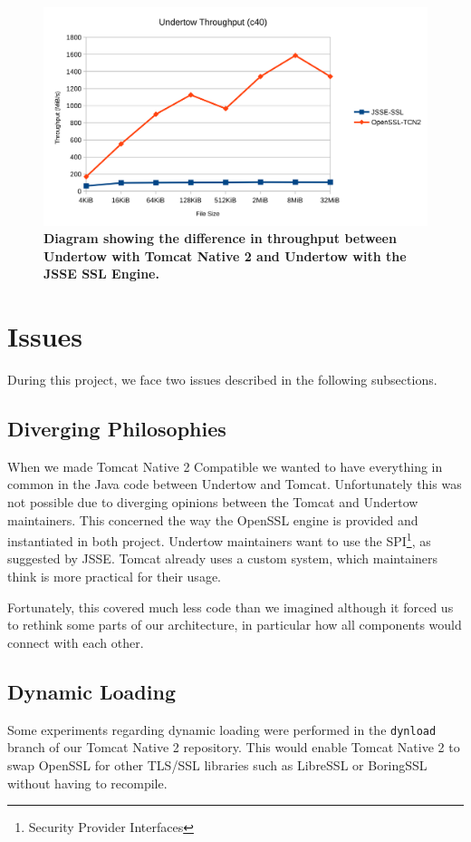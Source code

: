 \documentclass[11pt,a4paper,bibliography=totocnumbered]{scrartcl}
\def\mytitle{Tomcat Native 2}
\begin{document}
\begin{figure}[!h]
	\begin{center}
		\includegraphics[scale=0.23]{undertow-throughput.pdf}
	\end{center}
	\caption{\textbf{Diagram showing the difference in throughput between Undertow with \mytitle{} and Undertow with the JSSE SSL Engine.}}
	\label{fig:undertow-throughput}
\end{figure}

\FloatBarrier
\section{Issues}
\label{sec:issues}
During this project, we face two issues described in the following subsections.
\subsection{Diverging Philosophies}
When we made \mytitle{} Compatible we wanted to have everything in common in the Java code between Undertow and Tomcat. Unfortunately this was not possible due to diverging opinions between the Tomcat and Undertow maintainers. This concerned the way the OpenSSL engine is provided and instantiated in both project. Undertow maintainers want to use the SPI\footnote{Security Provider Interfaces}, as suggested by JSSE. Tomcat already uses a custom system, which maintainers think is more practical for their usage.

Fortunately, this covered much less code than we imagined although it forced us to rethink some parts of our architecture, in particular how all components would connect with each other.
\subsection{Dynamic Loading}
Some experiments regarding dynamic loading were performed in the \texttt{dynload} branch of our \mytitle{} repository. This would enable \mytitle{} to swap OpenSSL for other TLS/SSL libraries such as LibreSSL or BoringSSL without having to recompile.
\end{document}
